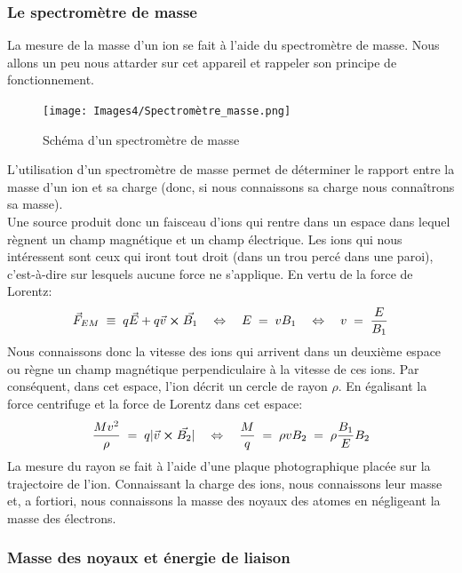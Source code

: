 \subsubsection{Le spectromètre de masse}


La mesure de la masse d'un ion se fait à l'aide du spectromètre de masse. Nous allons un peu nous attarder sur cet appareil et rappeler son principe de fonctionnement.
 \begin{figure}[H]
    \centering
    \texttt{[image: Images4/Spectromètre\_masse.png]}
    \caption{Schéma d'un spectromètre de masse}
    \label{fig:Schéma_spectrometre_masse}
\end{figure}
L'utilisation d'un spectromètre de masse permet de déterminer le rapport entre la masse d'un ion et sa charge (donc, si nous connaissons sa charge nous connaîtrons sa masse).\\
Une source produit donc un faisceau d'ions qui rentre dans un espace dans lequel règnent un champ magnétique et un champ électrique. Les ions qui nous intéressent sont ceux qui iront tout droit (dans un trou percé dans une paroi), c'est-à-dire sur lesquels aucune force ne s'applique. En vertu de la force de Lorentz:
\[
    \vec{F}_{EM} \;\equiv\;
    q\vec{E} + q\vec{v}\cross\vec{B_1}
    \quad \Leftrightarrow \quad
    E\; = \; vB_1
    \quad \Leftrightarrow \quad
    v \; = \; \dfrac{E}{B_1}
\]
Nous connaissons donc la vitesse des ions qui arrivent dans un deuxième espace ou règne un champ magnétique perpendiculaire à la vitesse de ces ions. Par conséquent, dans cet espace, l'ion décrit un cercle de rayon $\rho$. En égalisant la force centrifuge et la force de Lorentz dans cet espace:
\[
    \dfrac{Mv^2}{\rho} \; = \; q |\vec{v}\cross\vec{B_2}|
    \quad \Leftrightarrow \quad
    \dfrac{M}{q} \; = \; \rho v B_2 \; = \; \rho \dfrac{B_1}{E} B_2 
\]
La mesure du rayon se fait à l'aide d'une plaque photographique placée sur la trajectoire de l'ion. Connaissant la charge des ions, nous connaissons leur masse et, a fortiori, nous connaissons la masse des noyaux des atomes en négligeant la masse des électrons.


\subsubsection{Masse des noyaux et énergie de liaison}


